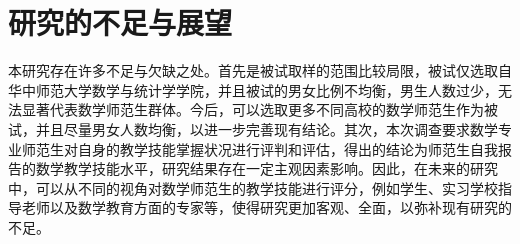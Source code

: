 \section{研究的不足与展望}

本研究存在许多不足与欠缺之处。首先是被试取样的范围比较局限，被试仅选取自华中师范大学数学与统计学学院，并且被试的男女比例不均衡，男生人数过少，无法显著代表数学师范生群体。今后，可以选取更多不同高校的数学师范生作为被试，并且尽量男女人数均衡，以进一步完善现有结论。其次，本次调查要求数学专业师范生对自身的教学技能掌握状况进行评判和评估，得出的结论为师范生自我报告的数学教学技能水平，研究结果存在一定主观因素影响。因此，在未来的研究中，可以从不同的视角对数学师范生的教学技能进行评分，例如学生、实习学校指导老师以及数学教育方面的专家等，使得研究更加客观、全面，以弥补现有研究的不足。